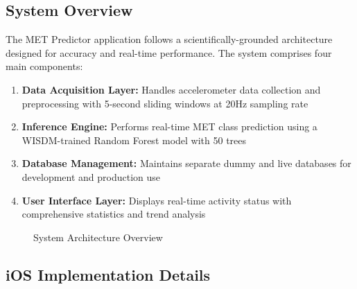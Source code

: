 \documentclass[11pt,a4paper]{article}
\begin{document}
\subsection{System Overview}

The MET Predictor application follows a scientifically-grounded architecture designed for accuracy and real-time performance. The system comprises four main components:

\begin{enumerate}
    \item \textbf{Data Acquisition Layer:} Handles accelerometer data collection and preprocessing with 5-second sliding windows at 20Hz sampling rate
    \item \textbf{Inference Engine:} Performs real-time MET class prediction using a WISDM-trained Random Forest model with 50 trees
    \item \textbf{Database Management:} Maintains separate dummy and live databases for development and production use
    \item \textbf{User Interface Layer:} Displays real-time activity status with comprehensive statistics and trend analysis
\end{enumerate}

\begin{figure}[H]
    \centering
    \caption{System Architecture Overview}
    \label{fig:architecture}
\end{figure}

\subsection{iOS Implementation Details}
\end{document}
